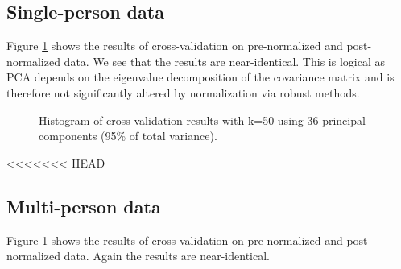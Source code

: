 \documentclass[paper=a4, fontsize=11pt]{scrartcl} %
\begin{document}
\subsection{Single-person data}
Figure \ref{fig:hist} shows the results of cross-validation on pre-normalized and post-normalized data. We see that the results are near-identical. This is logical as PCA depends on the eigenvalue decomposition of the covariance matrix and is therefore not significantly altered by normalization via robust methods.

\begin{figure}[h]
    \centering
    \caption{Histogram of cross-validation results with k=50 using 36 principal components (95\% of total variance).}
    \label{fig:hist}
\end{figure}

<<<<<<< HEAD
\clearpage
\subsection{Multi-person data}

Figure \ref{fig:hist} shows the results of cross-validation on pre-normalized and post-normalized data. Again the results are near-identical.%
\end{document}

